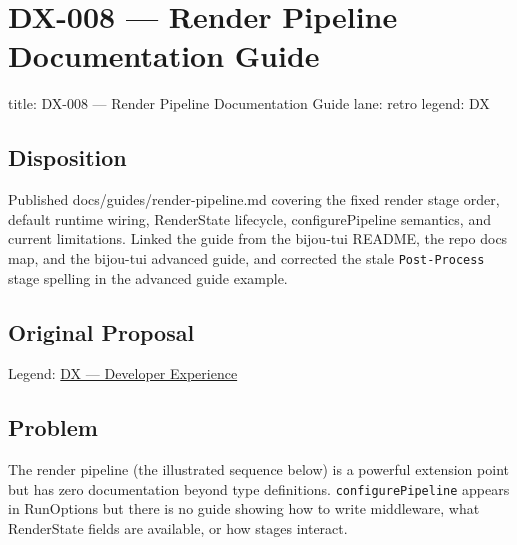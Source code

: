 \chapter{DX-008 --- Render Pipeline Documentation Guide}\label{record-340}

\smallskip

\begin{RecordMeta}
title: DX-008 — Render Pipeline Documentation Guide
lane: retro
legend: DX

\end{RecordMeta}

\section{Disposition}\label{record-340-disposition}

Published docs/guides/render-pipeline.md covering the fixed render stage order, default runtime wiring, RenderState lifecycle, configurePipeline semantics, and current limitations. Linked the guide from the bijou-tui README, the repo docs map, and the bijou-tui advanced guide, and corrected the stale \texttt{P\allowbreak{}o\allowbreak{}s\allowbreak{}t\allowbreak{}-\allowbreak{}P\allowbreak{}r\allowbreak{}o\allowbreak{}c\allowbreak{}e\allowbreak{}s\allowbreak{}s} stage spelling in the advanced guide example.

\section{Original Proposal}\label{record-340-original-proposal}

Legend: \href{https://github.com/flyingrobots/bijou/blob/1853ad902f6bf219326409e7f743a5a1d6517dbc/docs/method/legends/DX-developer-experience.md}{DX --- Developer Experience}

\section{Problem}\label{record-340-problem}

The render pipeline (the illustrated sequence below) is a powerful extension point but has zero documentation beyond type definitions. \texttt{c\allowbreak{}o\allowbreak{}n\allowbreak{}f\allowbreak{}i\allowbreak{}g\allowbreak{}u\allowbreak{}r\allowbreak{}e\allowbreak{}P\allowbreak{}i\allowbreak{}p\allowbreak{}e\allowbreak{}l\allowbreak{}i\allowbreak{}n\allowbreak{}e} appears in RunOptions but there is no guide showing how to write middleware, what RenderState fields are available, or how stages interact.

